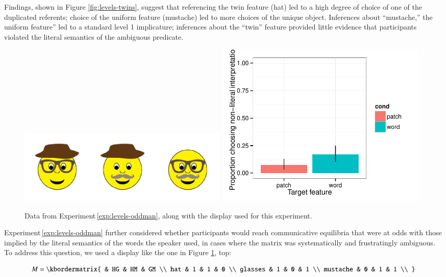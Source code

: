 \documentclass[man,noapacite]{apa2}
\newcounter{Experiment}
\newcommand{\exptref}[1]{Experiment\,\ref{#1}}
\begin{document}
Findings, shown in Figure \ref{fig:levels-twins}, suggest that referencing the twin feature ({\sc hat}) led to a high degree of choice of one of the duplicated referents; choice of the uniform feature ({\sc mustache}) led to more choices of the unique object. Inferences about ``mustache,'' the uniform feature'' led to a standard level 1 implicature; inferences about the ``twin'' feature provided little evidence that participants violated the literal semantics of the ambiguous predicate.

 \begin{figure}[t]
  \centering
  \includegraphics[width=4in]{figures/levels-oddman-stim.pdf}
  \includegraphics[width=4in]{../plots/3-levels-oddman.pdf}

  \caption{\label{fig:levels-oddman} Data from \exptref{exp:levels-oddman}, along with the display used for this experiment.}
\end{figure}

\exptref{exp:levels-oddman} further considered whether participants would reach communicative equilibria that were at odds with those implied by the literal semantics of the words the speaker used, in cases where the matrix was systematically and frustratingly ambiguous. To address this question, we used a display like the one in Figure \ref{fig:levels-oddman}, top:

\begin{equation}
    M = \kbordermatrix{
               & HG & HM & GM \\
      hat      & 1  & 1  & 0  \\
      glasses  & 1  & 0  & 1 \\
      mustache & 0  & 1  & 1 \\
    }
\end{equation}
\end{document}
